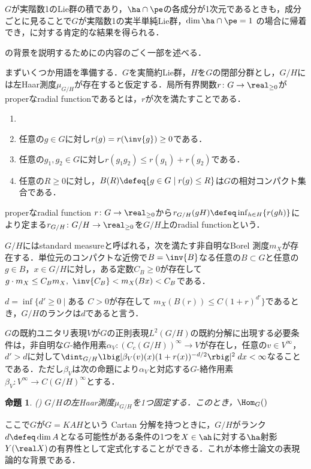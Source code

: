 \documentclass[12pt,dvipdfmx,uplatex]{jsarticle}
\newcounter{countabst}
\newtheorem{prop-a}[countabst]{命題}
\begin{document}
$G$が実階数1のLie群の積であり，$\ha\cap \pe $の各成分が1次元であるときも，成分ごとに見ることで$G$が実階数1の実半単純Lie群，$\dim \ha\cap\pe =1 $
の場合に帰着でき，に対する肯定的な結果を得られる．

の背景を説明するために\cite{ber88}の内容のごく一部を述べる．

まずいくつか用語を準備する．$G$を実簡約Lie群，$H$を$G$の閉部分群とし，$G/H$には左Haar測度$\mu_{G/H} $が存在すると仮定する．局所有界関数$r\colon G\to \real_{\geq 0} $がproperなradial functionであるとは，$r$が次を満たすことである．
  \begin{enumerate}
  \item {}
  \item 任意の$g\in G$に対し$r(g) = r(\inv{g})\geq 0  $である．
  \item 任意の$g_1,g_2\in G$に対し$r(g_1g_2)\leq r(g_1) + r(g_2)  $である．
  \item 任意の$R\geq 0$に対し，$B(R)\defeq \{g\in G\mid r(g)\leq R \} $は$G$の相対コンパクト集合である．
  \end{enumerate}
  properなradial function $r\colon G\to \real_{\geq 0} $から$r_{G/H}(gH)\defeq \inf_{h\in H}\{r(gh) \}$により定まる${r_{G/H}\colon G/H\to \real_{\geq 0}}$を$G/H$上のradial functionという．

  $G/H$にはstandard measureと呼ばれる，次を満たす非自明なBorel 測度$m_X $が存在する．単位元のコンパクトな近傍で$B = \inv{B} $なる任意の$B\subset G$と任意の$g\in B$，$x\in G/H$に対し，ある定数$C_B\geq 0 $が存在して$g\cdot m_X \leq C_B m_X,\   \inv{C_B} < m_X(Bx) < C_{B}$である．
  
  $d = \inf\{d'\geq 0\mid \text{ある } C > 0\text{が存在して }  m_X(B(r))\leq C(1+r)^{d'}\} $であるとき，$G/H$のランクは$d$であると言う．
  
  $G$の既約ユニタリ表現$V$が$G$の正則表現$L^2(G/H)$の既約分解に出現する必要条件は，非自明な$G$-絡作用素$\alpha_V\colon (C_c(G/H))^{\infty}\to V $が存在し，任意の$v\in V^{\infty} $，$d' > d$に対して$\dint_{G/H}\lbig|\beta_V(v)(x)(1+r(x))^{-d/2} \rbig|^2\; dx < \infty $なることである．ただし$\beta_V $は次の命題により$\alpha_V $と対応する$G$-絡作用素$\beta_V\colon V^{\infty}\to C(G/H)^{\infty}  $とする．
  \begin{prop-a}(\cite[p.~678]{ber88})
    $G/H$の左Haar測度$\mu_{G/H} $を1つ固定する．このとき，$\Hom_{G}() $
  \end{prop-a}

ここで$G$が$G = KAH$という Cartan 分解を持つときに，$G/H$がランク$d \defeq \dim A$となる可能性がある条件の1つを$X\in \ah$に対する$\ha$射影$Y(\real X) $の有界性として定式化することができる．これが本修士論文の表現論的な背景である．
\end{document}
